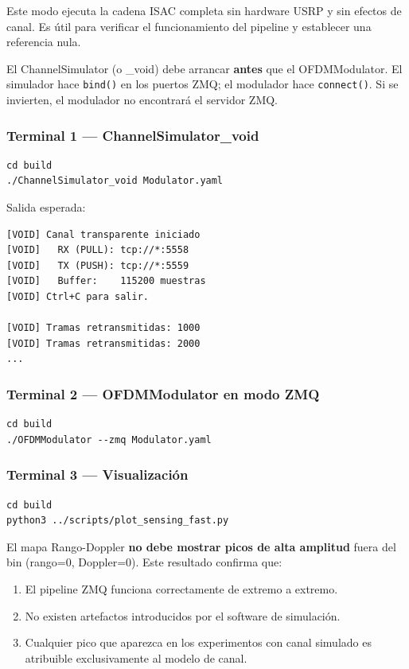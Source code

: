 \documentclass[11pt,a4paper]{article}
\begin{document}
Este modo ejecuta la cadena ISAC completa sin hardware USRP y sin efectos de canal.
Es útil para verificar el funcionamiento del pipeline y establecer una referencia nula.

\begin{warnbox}
El ChannelSimulator (o \_void) debe arrancar \textbf{antes} que el OFDMModulator.
El simulador hace \texttt{bind()} en los puertos ZMQ; el modulador hace \texttt{connect()}.
Si se invierten, el modulador no encontrará el servidor ZMQ.
\end{warnbox}

\subsubsection{Terminal 1 — ChannelSimulator\_void}

\begin{lstlisting}[style=bash]
cd build
./ChannelSimulator_void Modulator.yaml
\end{lstlisting}

Salida esperada:
\begin{lstlisting}[style=plain]
[VOID] Canal transparente iniciado
[VOID]   RX (PULL): tcp://*:5558
[VOID]   TX (PUSH): tcp://*:5559
[VOID]   Buffer:    115200 muestras
[VOID] Ctrl+C para salir.

[VOID] Tramas retransmitidas: 1000
[VOID] Tramas retransmitidas: 2000
...
\end{lstlisting}

\subsubsection{Terminal 2 — OFDMModulator en modo ZMQ}

\begin{lstlisting}[style=bash]
cd build
./OFDMModulator --zmq Modulator.yaml
\end{lstlisting}

\subsubsection{Terminal 3 — Visualización}

\begin{lstlisting}[style=bash]
cd build
python3 ../scripts/plot_sensing_fast.py
\end{lstlisting}

\begin{infobox}
El mapa Rango-Doppler \textbf{no debe mostrar picos de alta amplitud}
fuera del bin (rango=0, Doppler=0). Este resultado confirma que:
\begin{enumerate}
  \item El pipeline ZMQ funciona correctamente de extremo a extremo.
  \item No existen artefactos introducidos por el software de simulación.
  \item Cualquier pico que aparezca en los experimentos con canal simulado
        es atribuible exclusivamente al modelo de canal.
\end{enumerate}
\end{infobox}
\end{document}
